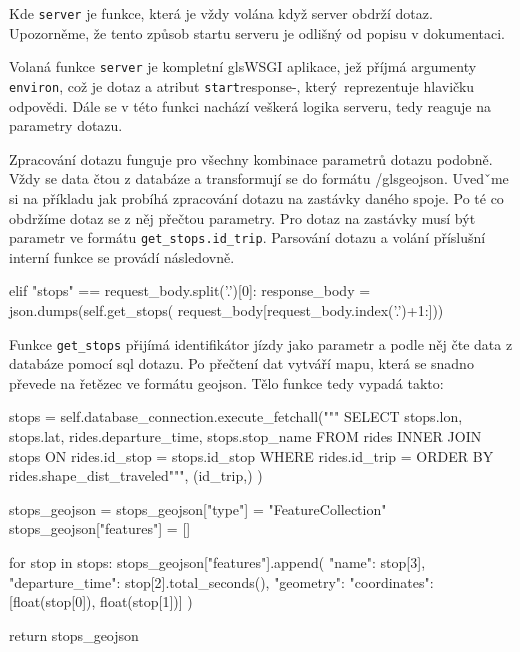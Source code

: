 Kde \verb-server- je funkce, která je vždy volána když server obdrží dotaz. Upozorněme, že tento způsob startu serveru je odlišný od popisu v dokumentaci.

\bigbreak

Volaná funkce \verb-server- je kompletní gls{WSGI} aplikace, jež příjmá argumenty \verb-environ-, což je dotaz a atribut \verb-start-response-, který reprezentuje hlavičku odpovědi. Dále se v této funkci nachází veškerá logika serveru, tedy reaguje na parametry dotazu.

\bigbreak

Zpracování dotazu funguje pro všechny kombinace parametrů dotazu podobně. Vždy se data čtou z databáze a transformují se do formátu /gls{geojson}. Uvedˇme si na příkladu jak probíhá zpracování dotazu na zastávky daného spoje. Po té co obdržíme dotaz se z něj přečtou parametry. Pro dotaz na zastávky musí být parametr ve formátu \verb-get_stops.id_trip-. Parsování dotazu a volání příslušní interní funkce se provádí následovně.

\begin{code}[frame=none]
elif "stops" == request_body.split('.')[0]:
  response_body = json.dumps(self.get_stops(
    request_body[request_body.index('.')+1:]))
\end{code}

Funkce \verb-get_stops- přijímá identifikátor jízdy jako parametr a podle něj čte data z databáze pomocí \gls{sql} dotazu. Po přečtení dat vytváří mapu, která se snadno převede na řetězec ve formátu \gls{geojson}. Tělo funkce tedy vypadá takto:

\begin{code}[frame=none]
stops = self.database_connection.execute_fetchall("""
SELECT
  stops.lon,
  stops.lat,
  rides.departure_time,
  stops.stop_name
FROM rides
INNER JOIN stops ON rides.id_stop = stops.id_stop
WHERE rides.id_trip = %
ORDER BY rides.shape_dist_traveled""",
(id_trip,)
)

stops_geojson = {}
stops_geojson["type"] = "FeatureCollection"
stops_geojson["features"] = []

for stop in stops:
stops_geojson["features"].append({
  "name": stop[3],
  "departure_time": stop[2].total_seconds(),
  "geometry": {
    "coordinates": [float(stop[0]), float(stop[1])]
  }
})

return stops_geojson
\end{code}



















